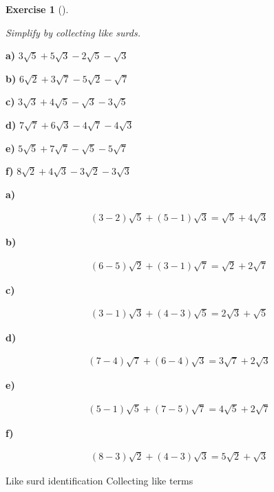 \documentclass[
  letterpaper,
  DIV=11,
  numbers=noendperiod]{scrreprt}
\theoremstyle{definition}
\newtheorem{exercise}{Exercise}[chapter]
\theoremstyle{remark}
\begin{document}
\begin{exercise}[]\protect\hypertarget{exr-u2-34}{}\label{exr-u2-34}

\emph{Simplify by collecting like surds.}

\textbf{a)} \(\displaystyle 3\sqrt{5}+5\sqrt{3}-2\sqrt{5}-\sqrt{3}\)

\textbf{b)} \(\displaystyle 6\sqrt{2}+3\sqrt{7}-5\sqrt{2}-\sqrt{7}\)

\textbf{c)} \(\displaystyle 3\sqrt{3}+4\sqrt{5}-\sqrt{3}-3\sqrt{5}\)

\textbf{d)} \(\displaystyle 7\sqrt{7}+6\sqrt{3}-4\sqrt{7}-4\sqrt{3}\)

\textbf{e)} \(\displaystyle 5\sqrt{5}+7\sqrt{7}-\sqrt{5}-5\sqrt{7}\)

\textbf{f)} \(\displaystyle 8\sqrt{2}+4\sqrt{3}-3\sqrt{2}-3\sqrt{3}\)

\begin{tcolorbox}[enhanced jigsaw, opacitybacktitle=0.6, coltitle=black, arc=.35mm, colframe=quarto-callout-tip-color-frame, colback=white, bottomrule=.15mm, left=2mm, colbacktitle=quarto-callout-tip-color!10!white, titlerule=0mm, opacityback=0, title=\textcolor{quarto-callout-tip-color}{\faLightbulb}\hspace{0.5em}{🔍 View Solutions}, leftrule=.75mm, breakable, rightrule=.15mm, bottomtitle=1mm, toptitle=1mm, toprule=.15mm]

\textbf{a)}

\[
\begin{aligned}
(3-2)\sqrt{5}+(5-1)\sqrt{3}=\sqrt{5}+4\sqrt{3}
\end{aligned}
\]

\textbf{b)}

\[
\begin{aligned}
(6-5)\sqrt{2}+(3-1)\sqrt{7}=\sqrt{2}+2\sqrt{7}
\end{aligned}
\]

\textbf{c)}

\[
\begin{aligned}
(3-1)\sqrt{3}+(4-3)\sqrt{5}=2\sqrt{3}+\sqrt{5}
\end{aligned}
\]

\textbf{d)}

\[
\begin{aligned}
(7-4)\sqrt{7}+(6-4)\sqrt{3}=3\sqrt{7}+2\sqrt{3}
\end{aligned}
\]

\textbf{e)}

\[
\begin{aligned}
(5-1)\sqrt{5}+(7-5)\sqrt{7}=4\sqrt{5}+2\sqrt{7}
\end{aligned}
\]

\textbf{f)}

\[
\begin{aligned}
(8-3)\sqrt{2}+(4-3)\sqrt{3}=5\sqrt{2}+\sqrt{3}
\end{aligned}
\]

\end{tcolorbox}

{Like surd identification} {Collecting like terms}

\end{exercise}
\end{document}

